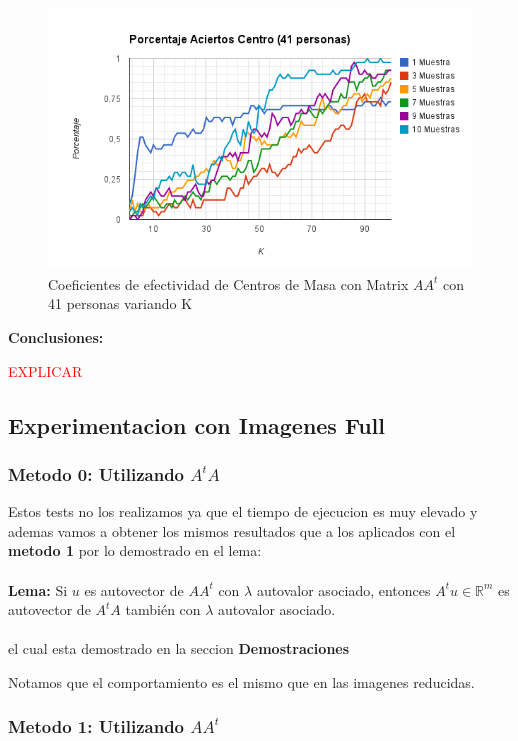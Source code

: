 \begin{figure}[H]
\includegraphics[width=1\textwidth]{img/imager.png}
     \caption{Coeficientes de efectividad de Centros de Masa con Matrix $AA^t$ con 41 personas variando K}
\end{figure}

\textbf{Conclusiones:}

\textcolor{red}{EXPLICAR}

\subsection{Experimentacion con Imagenes Full}

\subsubsection{Metodo 0: Utilizando $A^tA$}

Estos tests no los realizamos ya que el tiempo de ejecucion es muy elevado y ademas vamos  a obtener los mismos resultados que a los aplicados con el \textbf{metodo 1} por lo demostrado en el lema:
\\
\\
\textbf{Lema:} Si $u$ es autovector de $A A^t$ con $\lambda$ autovalor asociado, entonces $A^t u \in
\mathbb{R}^m$ es autovector de $A^t A$ también con $\lambda$ autovalor asociado.
\\
\\
 el cual esta demostrado en la seccion \textbf{Demostraciones}
 
Notamos que el comportamiento es el mismo que en las imagenes reducidas.


\subsubsection{Metodo 1: Utilizando $AA^t$}

